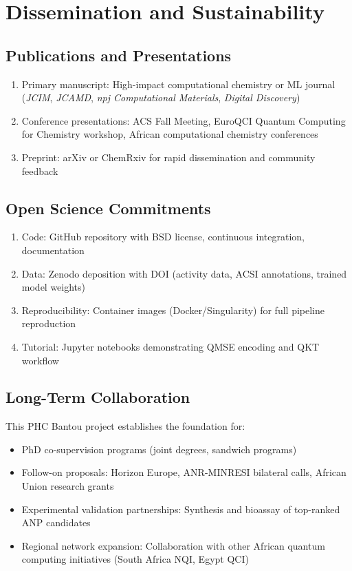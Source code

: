 \documentclass[11pt,a4paper]{article}
\begin{document}
\section{Dissemination and Sustainability}

\subsection{Publications and Presentations}

\begin{enumerate}
    \item Primary manuscript: High-impact computational chemistry or ML journal (\textit{JCIM}, \textit{JCAMD}, \textit{npj Computational Materials}, \textit{Digital Discovery})
    \item Conference presentations: ACS Fall Meeting, EuroQCI Quantum Computing for Chemistry workshop, African computational chemistry conferences
    \item Preprint: arXiv or ChemRxiv for rapid dissemination and community feedback
\end{enumerate}

\subsection{Open Science Commitments}

\begin{enumerate}
    \item Code: GitHub repository with BSD license, continuous integration, documentation
    \item Data: Zenodo deposition with DOI (activity data, ACSI annotations, trained model weights)
    \item Reproducibility: Container images (Docker/Singularity) for full pipeline reproduction
    \item Tutorial: Jupyter notebooks demonstrating QMSE encoding and QKT workflow
\end{enumerate}

\subsection{Long-Term Collaboration}

This PHC Bantou project establishes the foundation for:
\begin{itemize}
    \item PhD co-supervision programs (joint degrees, sandwich programs)
    \item Follow-on proposals: Horizon Europe, ANR-MINRESI bilateral calls, African Union research grants
    \item Experimental validation partnerships: Synthesis and bioassay of top-ranked ANP candidates
    \item Regional network expansion: Collaboration with other African quantum computing initiatives (South Africa NQI, Egypt QCI)
\end{itemize}
\end{document}
